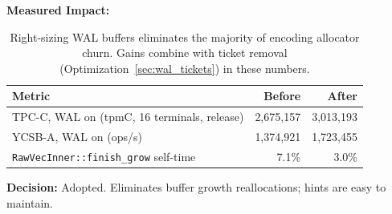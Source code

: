 \documentclass[11pt]{article}
\newcommand{\code}[1]{\texttt{#1}}
\begin{document}
\textbf{Measured Impact:}

\begin{table}[h]
\centering
\small
\begin{tabular}{lrr}
\toprule
\textbf{Metric} & \textbf{Before} & \textbf{After} \\
\midrule
TPC-C, WAL on (tpmC, 16 terminals, release) & 2,675,157 & 3,013,193 \\
YCSB-A, WAL on (ops/s) & 1,374,921 & 1,723,455 \\
\code{RawVecInner::finish\_grow} self-time & 7.1\% & 3.0\% \\
\bottomrule
\end{tabular}
\caption{Right-sizing WAL buffers eliminates the majority of encoding allocator churn.
Gains combine with ticket removal (Optimization~\ref{sec:wal_tickets}) in these numbers.}
\label{tab:buffer_sizing}
\end{table}

\textbf{Decision:} Adopted. Eliminates buffer growth reallocations; hints are easy to
maintain.
\end{document}
